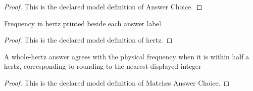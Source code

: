 \begin{proof}
  This is the declared model definition of Answer Choice.
\end{proof}
\begin{definition}[hertz]
  \label{def:physics:phyx-mini-0252:phyxminiproblems-problemphyxmini0252-answerchoice-hertz}
  Frequency in hertz printed beside each answer label
\end{definition}
\begin{proof}
  This is the declared model definition of hertz.
\end{proof}
\begin{definition}
  \label{def:physics:phyx-mini-0252:phyxminiproblems-problemphyxmini0252-matchesanswerchoice}
  A whole-hertz answer agrees with the physical frequency when it is within half a hertz, corresponding to rounding to the nearest displayed integer
\end{definition}
\begin{proof}
  This is the declared model definition of Matches Answer Choice.
\end{proof}
